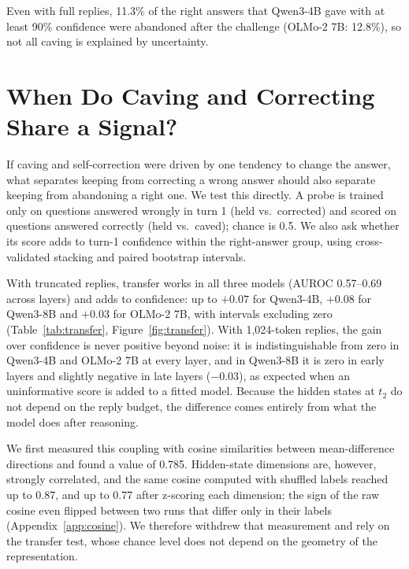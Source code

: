 Even with full replies, 11.3\% of the right answers that Qwen3-4B gave with at least 90\% confidence were abandoned after the challenge (OLMo-2 7B: 12.8\%), so not all caving is explained by uncertainty.

\section{When Do Caving and Correcting Share a Signal?}
\label{sec:coupling}

If caving and self-correction were driven by one tendency to change the answer, what separates keeping from correcting a wrong answer should also separate keeping from abandoning a right one. We test this directly. A probe is trained only on questions answered wrongly in turn 1 (held vs.\ corrected) and scored on questions answered correctly (held vs.\ caved); chance is 0.5. We also ask whether its score adds to turn-1 confidence within the right-answer group, using cross-validated stacking and paired bootstrap intervals.

With truncated replies, transfer works in all three models (AUROC 0.57--0.69 across layers) and adds to confidence: up to $+0.07$ for Qwen3-4B, $+0.08$ for Qwen3-8B and $+0.03$ for OLMo-2 7B, with intervals excluding zero (Table~\ref{tab:transfer}, Figure~\ref{fig:transfer}). With 1{,}024-token replies, the gain over confidence is never positive beyond noise: it is indistinguishable from zero in Qwen3-4B and OLMo-2 7B at every layer, and in Qwen3-8B it is zero in early layers and slightly negative in late layers ($-0.03$), as expected when an uninformative score is added to a fitted model. Because the hidden states at $t_2$ do not depend on the reply budget, the difference comes entirely from what the model does after reasoning.

We first measured this coupling with cosine similarities between mean-difference directions and found a value of 0.785. Hidden-state dimensions are, however, strongly correlated, and the same cosine computed with shuffled labels reached up to 0.87, and up to 0.77 after z-scoring each dimension; the sign of the raw cosine even flipped between two runs that differ only in their labels (Appendix~\ref{app:cosine}). We therefore withdrew that measurement and rely on the transfer test, whose chance level does not depend on the geometry of the representation.

